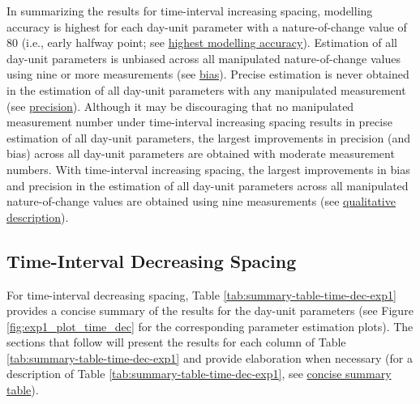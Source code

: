 \documentclass[
12pt, %
twoside,
english]{guelphthesis}
\theoremstyle{definition}
\theoremstyle{definition}
\theoremstyle{definition}
\theoremstyle{definition}
\theoremstyle{remark}
\begin{document}
In summarizing the results for time-interval increasing spacing, modelling accuracy is highest for each day-unit parameter with a nature-of-change value of 80 (i.e., early halfway point; see \protect\hyperlink{nature-change-time-inc-exp1}{highest modelling accuracy}). Estimation of all day-unit parameters is unbiased across all manipulated nature-of-change values using nine or more measurements (see \protect\hyperlink{bias-time-inc-exp1}{bias}). Precise estimation is never obtained in the estimation of all day-unit parameters with any manipulated measurement (see \protect\hyperlink{precision-time-inc-exp1}{precision}). Although it may be discouraging that no manipulated measurement number under time-interval increasing spacing results in precise estimation of all day-unit parameters, the largest improvements in precision (and bias) across all day-unit parameters are obtained with moderate measurement numbers. With time-interval increasing spacing, the largest improvements in bias and precision in the estimation of all day-unit parameters across all manipulated nature-of-change values are obtained using nine measurements (see \protect\hyperlink{qualitative-time-inc-exp1}{qualitative description}).

\hypertarget{time-interval-decreasing-spacing}{%
\subsection{Time-Interval Decreasing Spacing}\label{time-interval-decreasing-spacing}}

For time-interval decreasing spacing, Table \ref{tab:summary-table-time-dec-exp1} provides a concise summary of the results for the day-unit parameters (see Figure \ref{fig:exp1_plot_time_dec} for the corresponding parameter estimation plots). The sections that follow will present the results for each column of Table \ref{tab:summary-table-time-dec-exp1} and provide elaboration when necessary (for a description of Table \ref{tab:summary-table-time-dec-exp1}, see \protect\hyperlink{concise-tab}{concise summary table}).
\end{document}
